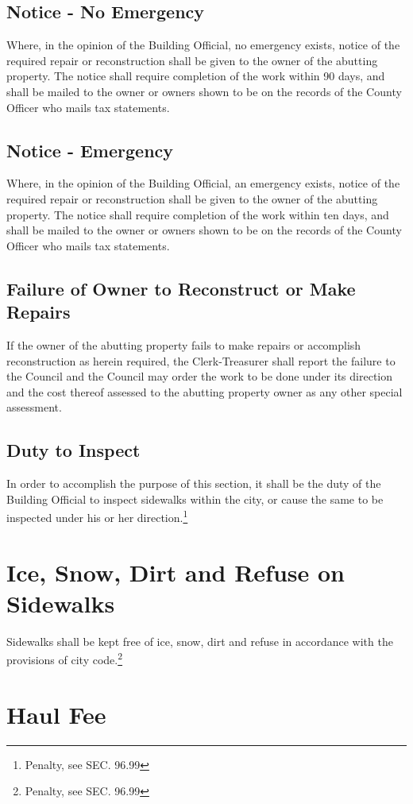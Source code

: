 \subsection{Notice - No Emergency}
Where, in the opinion of the Building Official, no emergency exists, notice of the required repair or reconstruction shall be given to the owner of the abutting property.  The notice shall require completion of the work within 90 days, and shall be mailed to the owner or owners shown to be on the records of the County Officer who mails tax statements.
\subsection{Notice - Emergency}
Where, in the opinion of the Building Official, an emergency exists, notice of the required repair or reconstruction shall be given to the owner of the abutting property.  The notice shall require completion of the work within ten days, and shall be mailed to the owner or owners shown to be on the records of the County Officer who mails tax statements.
\subsection{Failure of Owner to Reconstruct or Make Repairs}
If the owner of the abutting property fails to make repairs or accomplish reconstruction as herein required, the Clerk-Treasurer shall report the failure to the Council and the Council may order the work to be done under its direction and the cost thereof assessed to the abutting property owner as any other special assessment.
\subsection{Duty to Inspect}
In order to accomplish the purpose of this section, it shall be the duty of the Building Official to inspect sidewalks within the city, or cause the same to be inspected under his or her direction.\footnote{Penalty, see SEC. 96.99}

\section{Ice, Snow, Dirt and Refuse on Sidewalks}
Sidewalks shall be kept free of ice, snow, dirt and refuse in accordance with the provisions of city code.\footnote{Penalty, see SEC. 96.99}

\section{Haul Fee}
